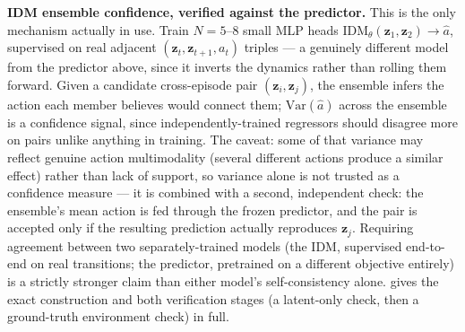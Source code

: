 \documentclass[11pt]{article}
\newcommand{\zv}{\mathbf{z}}
\begin{document}
\textbf{IDM ensemble confidence, verified against the predictor.} This is the only mechanism
actually in use. Train $N{=}5\text{--}8$ small MLP heads
$\mathrm{IDM}_\theta(\zv_1,\zv_2) \to \hat a$, supervised on real adjacent
$(\zv_t,\zv_{t+1},a_t)$ triples --- a genuinely different model from the predictor above,
since it inverts the dynamics rather than rolling them forward. Given a candidate cross-episode
pair $(\zv_i,\zv_j)$, the ensemble infers the action each member believes would connect them;
$\mathrm{Var}(\hat a)$ across the ensemble is a confidence signal, since independently-trained
regressors should disagree more on pairs unlike anything in training. The caveat: some of that
variance may reflect genuine action multimodality (several different actions produce a similar
effect) rather than lack of support, so variance alone is not trusted as a confidence measure ---
it is combined with a second, independent check: the ensemble's mean action is fed through the
frozen predictor, and the pair is accepted only if the resulting prediction actually reproduces
$\zv_j$. Requiring agreement between two separately-trained models (the IDM, supervised
end-to-end on real transitions; the predictor, pretrained on a different objective entirely) is
a strictly stronger claim than either model's self-consistency alone. 
gives the exact construction and both verification stages (a latent-only check, then a
ground-truth environment check) in full.
\end{document}
